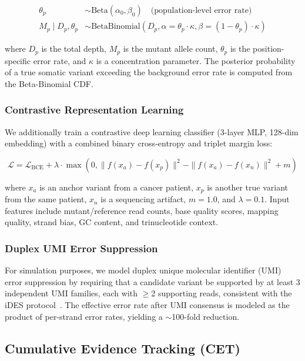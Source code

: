 \documentclass[10pt,a4paper]{article}
\begin{document}
\begin{align}
\theta_p &\sim \text{Beta}(\alpha_0, \beta_0) \quad \text{(population-level error rate)} \\
M_p \mid D_p, \theta_p &\sim \text{BetaBinomial}(D_p, \alpha = \theta_p \cdot \kappa, \beta = (1-\theta_p) \cdot \kappa)
\end{align}

where $D_p$ is the total depth, $M_p$ is the mutant allele count, $\theta_p$ is the position-specific error rate, and $\kappa$ is a concentration parameter. The posterior probability of a true somatic variant exceeding the background error rate is computed from the Beta-Binomial CDF.

\subsubsection{Contrastive Representation Learning}

We additionally train a contrastive deep learning classifier (3-layer MLP, 128-dim embedding) with a combined binary cross-entropy and triplet margin loss:

\begin{equation}
\mathcal{L} = \mathcal{L}_{\text{BCE}} + \lambda \cdot \max(0, \|f(x_a) - f(x_p)\|^2 - \|f(x_a) - f(x_n)\|^2 + m)
\end{equation}

where $x_a$ is an anchor variant from a cancer patient, $x_p$ is another true variant from the same patient, $x_n$ is a sequencing artifact, $m = 1.0$, and $\lambda = 0.1$. Input features include mutant/reference read counts, base quality scores, mapping quality, strand bias, GC content, and trinucleotide context.

\subsubsection{Duplex UMI Error Suppression}

For simulation purposes, we model duplex unique molecular identifier (UMI) error suppression by requiring that a candidate variant be supported by at least 3 independent UMI families, each with $\geq$2 supporting reads, consistent with the iDES protocol~\cite{newman2016integrated}. The effective error rate after UMI consensus is modeled as the product of per-strand error rates, yielding a $\sim$100-fold reduction.

\subsection{Cumulative Evidence Tracking (CET)}
\end{document}
